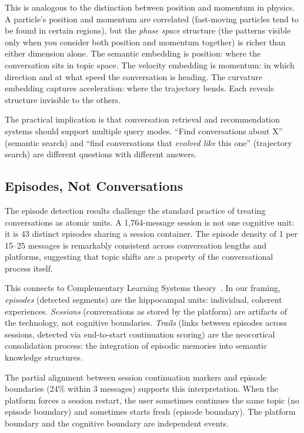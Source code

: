 \documentclass[11pt]{article}
\begin{document}
This is analogous to the distinction between position and momentum in physics. A particle's position and momentum are correlated (fast-moving particles tend to be found in certain regions), but the \emph{phase space} structure (the patterns visible only when you consider both position and momentum together) is richer than either dimension alone. The semantic embedding is position: where the conversation sits in topic space. The velocity embedding is momentum: in which direction and at what speed the conversation is heading. The curvature embedding captures acceleration: where the trajectory bends. Each reveals structure invisible to the others.

The practical implication is that conversation retrieval and recommendation systems should support multiple query modes. ``Find conversations about X'' (semantic search) and ``find conversations that \emph{evolved like} this one'' (trajectory search) are different questions with different answers.

\subsection{Episodes, Not Conversations}

The episode detection results challenge the standard practice of treating conversations as atomic units. A 1,764-message session is not one cognitive unit: it is 43 distinct episodes sharing a session container. The episode density of 1 per 15--25 messages is remarkably consistent across conversation lengths and platforms, suggesting that topic shifts are a property of the conversational process itself.

This connects to Complementary Learning Systems theory~\citep{mcclelland1995complementary,kumaran2016complementary}. In our framing, \emph{episodes} (detected segments) are the hippocampal units: individual, coherent experiences. \emph{Sessions} (conversations as stored by the platform) are artifacts of the technology, not cognitive boundaries. \emph{Trails} (links between episodes across sessions, detected via end-to-start continuation scoring) are the neocortical consolidation process: the integration of episodic memories into semantic knowledge structures.

The partial alignment between session continuation markers and episode boundaries (24\% within 3 messages) supports this interpretation. When the platform forces a session restart, the user sometimes continues the same topic (no episode boundary) and sometimes starts fresh (episode boundary). The platform boundary and the cognitive boundary are independent events.
\end{document}
